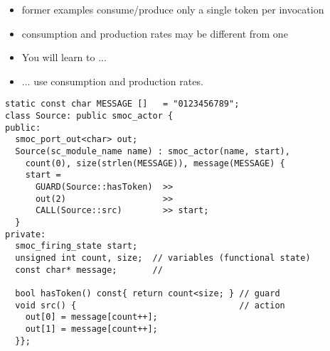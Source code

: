 \begin{frame}
\begin{itemize}
\item former examples consume/produce only a single token per invocation
\item consumption and production rates may be different from one
\end{itemize}
\begin{itemize}
\item You will learn to ...
\item ... use consumption and production rates.
\end{itemize}
\end{frame}




\begin{frame}[fragile=singleslide]
\begin{lstlisting}
static const char MESSAGE []   = "0123456789";
class Source: public smoc_actor {
public:
  smoc_port_out<char> out;
  Source(sc_module_name name) : smoc_actor(name, start),
    count(0), size(strlen(MESSAGE)), message(MESSAGE) {
    start = 
      GUARD(Source::hasToken)  >>
      out(2)                   >>
      CALL(Source::src)        >> start;
  }
private:
  smoc_firing_state start;
  unsigned int count, size;  // variables (functional state)
  const char* message;       //

  bool hasToken() const{ return count<size; } // guard
  void src() {                                // action
    out[0] = message[count++];
    out[1] = message[count++];
  }};
\end{lstlisting}
\end{frame}





